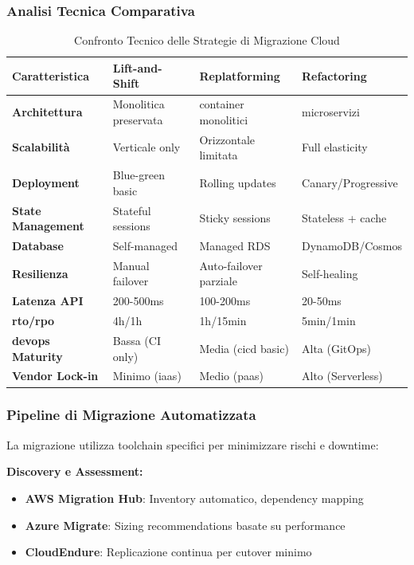 \subsubsection{\texorpdfstring{Analisi Tecnica Comparativa}{3.4.1.2 - Analisi Tecnica Comparativa}}

\begin{table}[htbp]
\centering
\caption{Confronto Tecnico delle Strategie di Migrazione Cloud}
\label{tab:cloud_migration_technical}
\begin{tabular}{p{3cm}p{3.5cm}p{3.5cm}p{3.5cm}}
\toprule
\textbf{Caratteristica} & \textbf{Lift-and-Shift} & \textbf{Replatforming} & \textbf{Refactoring} \\
\midrule
\textbf{Architettura} & Monolitica preservata & \gls{container} monolitici & \gls{microservizi} \\
\textbf{Scalabilità} & Verticale only & Orizzontale limitata & Full elasticity \\
\textbf{Deployment} & Blue-green basic & Rolling updates & Canary/Progressive \\
\textbf{State Management} & Stateful sessions & Sticky sessions & Stateless + cache \\
\textbf{Database} & Self-managed & Managed RDS & DynamoDB/Cosmos \\
\textbf{Resilienza} & Manual failover & Auto-failover parziale & Self-healing \\
\textbf{Latenza API} & 200-500ms & 100-200ms & 20-50ms \\
\textbf{\gls{rto}/\gls{rpo}} & 4h/1h & 1h/15min & 5min/1min \\
\textbf{\gls{devops} Maturity} & Bassa (CI only) & Media (\gls{cicd} basic) & Alta (GitOps) \\
\textbf{Vendor Lock-in} & Minimo (\gls{iaas}) & Medio (\gls{paas}) & Alto (Serverless) \\
\bottomrule
\end{tabular}
\end{table}

\subsubsection{\texorpdfstring{Pipeline di Migrazione Automatizzata}{3.4.1.3 - Pipeline di Migrazione Automatizzata}}

La migrazione utilizza toolchain specifici per minimizzare rischi e downtime:

\textbf{Discovery e Assessment:}
\begin{itemize}
    \item \textbf{AWS Migration Hub}: Inventory automatico, dependency mapping
    \item \textbf{Azure Migrate}: Sizing recommendations basate su performance
    \item \textbf{CloudEndure}: Replicazione continua per cutover minimo
\end{itemize}

